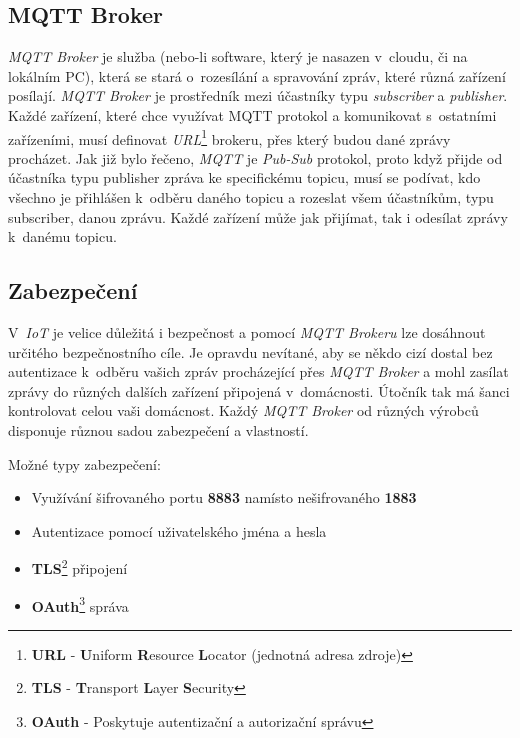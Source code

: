 \subsection*{MQTT Broker}
\emph{MQTT Broker} je služba (nebo-li software, který je nasazen v~cloudu, či na lokálním PC), která se stará o~rozesílání a spravování zpráv, které různá zařízení posílají.
\emph{MQTT Broker} je prostředník mezi účastníky typu \emph{subscriber} a \emph{publisher}.
Každé zařízení, které chce využívat MQTT protokol a komunikovat s~ostatními zařízeními, musí definovat \emph{URL}\footnote{\textbf{URL} - \textbf{U}niform \textbf{R}esource \textbf{L}ocator (jednotná adresa zdroje)} brokeru, přes který budou dané zprávy procházet.
Jak již bylo řečeno, \emph{MQTT} je \emph{Pub-Sub} protokol, proto když přijde od účastníka typu publisher zpráva ke specifickému topicu, musí se podívat, kdo všechno je přihlášen k~odběru daného topicu a rozeslat všem účastníkům, typu subscriber, danou zprávu.
Každé zařízení může jak přijímat, tak i odesílat zprávy k~danému topicu.~\cite{wiki:mqtt}

\subsection*{Zabezpečení}
V~\emph{IoT} je velice důležitá i bezpečnost a pomocí \emph{MQTT Brokeru} lze dosáhnout určitého bezpečnostního cíle.
Je opravdu nevítané, aby se někdo cizí dostal bez autentizace k~odběru vašich zpráv procházející přes \emph{MQTT Broker} a mohl zasílat zprávy do různých dalších zařízení připojená v~domácnosti.
Útočník tak má šanci kontrolovat celou vaši domácnost.
Každý \emph{MQTT Broker} od různých výrobců disponuje různou sadou zabezpečení a vlastností.~\cite{wiki:mqtt}
\newline

Možné typy zabezpečení:
\begin{itemize}
  \item Využívání šifrovaného portu \textbf{8883} namísto nešifrovaného \textbf{1883}
  \item Autentizace pomocí uživatelského jména a hesla
  \item \textbf{TLS}\footnote{\textbf{TLS} - \textbf{T}ransport \textbf{L}ayer \textbf{S}ecurity} připojení
  \item \textbf{OAuth}\footnote{\textbf{OAuth} - Poskytuje autentizační a autorizační správu} správa
\end{itemize}

\newpage

